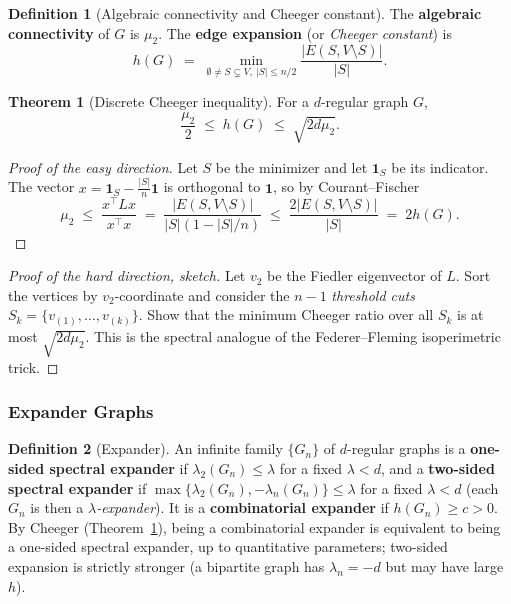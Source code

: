 \documentclass{article}
\theoremstyle{definition}
\newtheorem{theorem}{Theorem}
\newtheorem{definition}{Definition}
\begin{document}
\begin{definition}[Algebraic connectivity and Cheeger constant]
The \textbf{algebraic connectivity} of $G$ is $\mu_2$. The
\textbf{edge expansion} (or \emph{Cheeger constant}) is
\[
  h(G) \;=\; \min_{\emptyset \ne S \subsetneq V,\ |S| \le n/2}
             \frac{|E(S, V \setminus S)|}{|S|}.
\]
\end{definition}

\begin{theorem}[Discrete Cheeger inequality]\label{thm:cheeger}
For a $d$-regular graph $G$,
\[
  \frac{\mu_2}{2} \;\le\; h(G) \;\le\; \sqrt{2 d \mu_2}.
\]
\end{theorem}

\begin{proof}[Proof of the easy direction]
Let $S$ be the minimizer and let $\mathbf 1_S$ be its indicator. The
vector $x = \mathbf 1_S - \frac{|S|}{n}\mathbf 1$ is orthogonal to
$\mathbf 1$, so by Courant--Fischer
\[
  \mu_2 \;\le\; \frac{x^\top L x}{x^\top x}
       \;=\; \frac{|E(S, V \setminus S)|}{|S|(1 - |S|/n)}
       \;\le\; \frac{2 |E(S, V \setminus S)|}{|S|}
       \;=\; 2 h(G).
\]
\end{proof}

\begin{proof}[Proof of the hard direction, sketch]
Let $v_2$ be the Fiedler eigenvector of $L$. Sort the vertices by
$v_2$-coordinate and consider the $n - 1$ \emph{threshold cuts}
$S_k = \{v_{(1)}, \dots, v_{(k)}\}$. Show that the minimum Cheeger
ratio over all $S_k$ is at most $\sqrt{2 d \mu_2}$. This is the
spectral analogue of the Federer--Fleming isoperimetric trick.
\end{proof}

\subsubsection{Expander Graphs}

\begin{definition}[Expander]
An infinite family $\{G_n\}$ of $d$-regular graphs is a
\textbf{one-sided spectral expander} if $\lambda_2(G_n) \le \lambda$ for a
fixed $\lambda < d$, and a \textbf{two-sided spectral expander} if
$\max\{\lambda_2(G_n), -\lambda_n(G_n)\} \le \lambda$ for a fixed $\lambda < d$
(each $G_n$ is then a \emph{$\lambda$-expander}). It is a
\textbf{combinatorial expander} if
$h(G_n) \ge c > 0$. By Cheeger (Theorem~\ref{thm:cheeger}), being a
combinatorial expander is equivalent to being a one-sided spectral
expander, up to quantitative parameters; two-sided expansion is strictly
stronger (a bipartite graph has $\lambda_n = -d$ but may have large $h$).
\end{definition}
\end{document}
